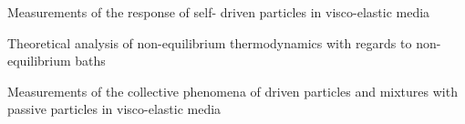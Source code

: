 \begin{workpackage}
\begin{wpdelivs}
  \begin{wpdeliv}[due=48,id=brown-d3,dissem=PU,nature=DEM,lead=USTUTT]
       {Measurements of the response of self- driven particles in visco-elastic media}
 \end{wpdeliv}
\begin{wpdeliv}[due=48,id=brown-d4,dissem=PU,nature=DEM,lead=USTUTT]
      {Theoretical analysis of non-equilibrium thermodynamics with regards to non-equilibrium baths}
\end{wpdeliv}
 \begin{wpdeliv}[due=48,id=brown-d5,dissem=PU,nature=DEM,lead=USTUTT]
      {Measurements of the collective phenomena of driven particles and mixtures with passive particles in visco-elastic media}
\end{wpdeliv}
\end{wpdelivs}

\end{workpackage}

